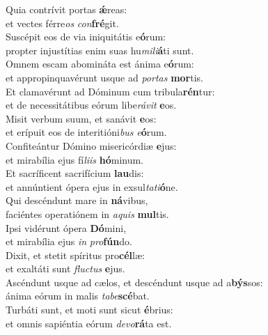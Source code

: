 \evenverse Quia contrívit portas \textbf{ǽ}reas:~\*\\
\evenverse et vectes férre\textit{os} \textit{con}\textbf{fré}git.\\
\oddverse Suscépit eos de via iniquitátis e\textbf{ó}rum:~\*\\
\oddverse propter injustítias enim suas hu\textit{mi}\textit{li}\textbf{á}ti sunt.\\
\evenverse Omnem escam abomináta est ánima e\textbf{ó}rum:~\*\\
\evenverse et appropinquavérunt usque ad \textit{por}\textit{tas} \textbf{mor}tis.\\
\oddverse Et clamavérunt ad Dóminum cum tribula\textbf{rén}tur:~\*\\
\oddverse et de necessitátibus eórum libe\textit{rá}\textit{vit} \textbf{e}os.\\
\evenverse Misit verbum suum, et sanávit \textbf{e}os:~\*\\
\evenverse et erípuit eos de interitióni\textit{bus} \textit{e}\textbf{ó}rum.\\
\oddverse Confiteántur Dómino misericórdiæ \textbf{e}jus:~\*\\
\oddverse et mirabília ejus fí\textit{li}\textit{is} \textbf{hó}minum.\\
\evenverse Et sacríficent sacrifícium \textbf{lau}dis:~\*\\
\evenverse et annúntient ópera ejus in exsul\textit{ta}\textit{ti}\textbf{ó}ne.\\
\oddverse Qui descéndunt mare in \textbf{ná}vibus,~\*\\
\oddverse faciéntes operatiónem in \textit{a}\textit{quis} \textbf{mul}tis.\\
\evenverse Ipsi vidérunt ópera \textbf{Dó}mini,~\*\\
\evenverse et mirabília ejus \textit{in} \textit{pro}\textbf{fún}do.\\
\oddverse Dixit, et stetit spíritus pro\textbf{cél}læ:~\*\\
\oddverse et exaltáti sunt \textit{flu}\textit{ctus} \textbf{e}jus.\\
\evenverse Ascéndunt usque ad cælos, et descéndunt usque ad a\textbf{býs}sos:~\*\\
\evenverse ánima eórum in malis \textit{ta}\textit{be}\textbf{scé}bat.\\
\oddverse Turbáti sunt, et moti sunt sicut \textbf{é}brius:~\*\\
\oddverse et omnis sapiéntia eórum \textit{de}\textit{vo}\textbf{rá}ta est.\\
